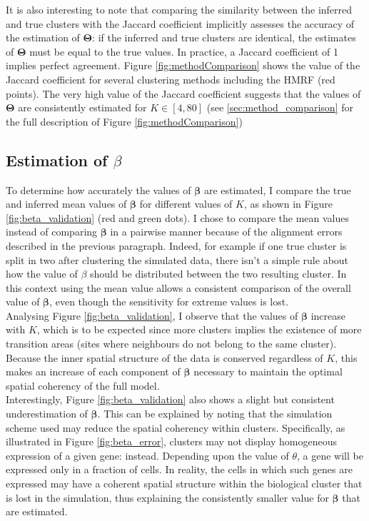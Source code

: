 	It is also interesting to note that comparing the similarity between the inferred and true clusters with the Jaccard coefficient implicitly assesses the accuracy of the estimation of $\boldsymbol{\Theta}$: if the inferred and true clusters are identical, the estimates of $\boldsymbol{\Theta}$ must be equal to the true values. In practice, a Jaccard coefficient of 1 implies perfect agreement. Figure \ref{fig:methodComparison} shows the value of the Jaccard coefficient for several clustering methods including the HMRF (red points). The very high value of the Jaccard coefficient suggests that the values of $\boldsymbol{\Theta}$ are consistently estimated for $K \in [4,80]$ (see \ref{sec:method_comparison} for the full description of Figure \ref{fig:methodComparison})\\
	

	\subsection{Estimation of $\beta$}\label{subsec:beta_estimation}
	To determine how accurately the values of $\boldsymbol{\beta}$ are estimated, I compare the true and inferred mean values of $\boldsymbol{\beta}$ for different values of $K$, as shown in Figure \ref{fig:beta_validation} (red and green dots). I chose to compare the mean values instead of comparing $\boldsymbol{\beta}$ in a pairwise manner because of the alignment errors described in the previous paragraph. Indeed, for example if one true cluster is split in two after clustering the simulated data, there isn't a simple rule about how the value of $\beta$ should be distributed between the two resulting cluster. In this context using the mean value allows a consistent comparison of the overall value of $\boldsymbol{\beta}$, even though the sensitivity for extreme values is lost.\\

	 Analysing Figure \ref{fig:beta_validation}, I observe that the values of $\boldsymbol{\beta}$ increase with $K$, which is to be expected since more clusters implies the existence of more transition areas (sites where neighbours do not belong to the same cluster). Because the inner spatial structure of the data is conserved regardless of $K$, this makes an increase of each component of $\boldsymbol{\beta}$ necessary to maintain the optimal spatial coherency of the full model.\\
	
	Interestingly, Figure \ref{fig:beta_validation} also shows a slight but consistent underestimation of $\boldsymbol{\beta}$. This can be explained by noting that the simulation scheme used may reduce the spatial coherency within clusters. Specifically, as illustrated in Figure \ref{fig:beta_error}, clusters may not display homogeneous expression of a given gene: instead. Depending upon the value of $\theta$, a gene will be expressed only in a fraction of cells. In reality, the cells in which such genes are expressed may have a coherent spatial structure within the biological cluster that is lost in the simulation, thus explaining the consistently smaller value for $\boldsymbol{\beta}$ that are estimated.\\
	
